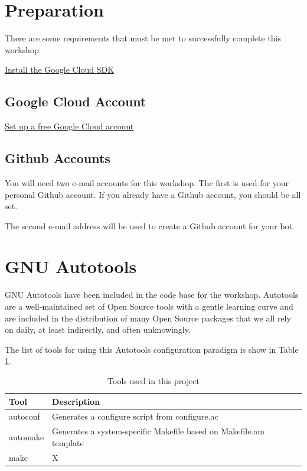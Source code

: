 \section{\label{sec:preparation}Preparation}

\justifying
There are some requirements that must be met to successfully complete this workshop.

\href{https://cloud.google.com/sdk/docs/install}{Install the Google Cloud SDK}

\subsection{\label{sec:account}Google Cloud Account}

\justifying

\href{https://cloud.google.com/free/}{Set up a free Google Cloud account}

\subsection{\label{sec:ghaccount}Github Accounts}

\justifying
You will need two e-mail accounts for this workshop. The first is used for your personal Github
account. If you already have a Github account, you should be all set.

\justifying
The second e-mail address will be used to create a Github account for your bot.

\section{\label{sec:autotools}GNU Autotools}

\justifying
GNU Autotools have been included in the code base for the workshop. Autotools are a well-maintained set of Open Source tools with a gentle learning curve and are included in the distribution of many Open Source packages that we all rely on daily, at least indirectly, and often unknowingly.

\justifying
The list of tools for using this Autotools configuration paradigm is show in Table \ref{Autotools}.
\vspace{2mm}

\begin{table}[ht]
	\centering
	\begin{tabular}{|l|l|}\hline
		Tool & Description \\\hline
		autoconf & Generates a configure script from configure.ac   \\\hline
		automake & Generates a system-specific Makefile based on Makefile.am template    \\\hline
		make  &   X    \\\hline
	\end{tabular}
	\caption{Tools used in this project}
	\label{Autotools}
\end{table}
\vspace{2mm}

